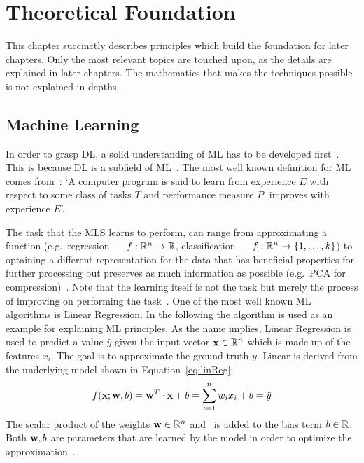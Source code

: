 \chapter{Theoretical Foundation}\label{ch:theoretical}
This chapter succinctly describes principles which build the foundation for later chapters.
Only the most relevant topics are touched upon, as the details are explained in later chapters.
The mathematics that makes the techniques possible is not explained in depths.

\section{Machine Learning}
In order to grasp \ac{DL}, a solid understanding of \ac{ML} has to be developed
first~\citep{goodfellow_deep_2016}.
This is because \ac{DL} is a subfield of \ac{ML}~\citep{chauhan_review_2018}.
The most well known definition for \ac{ML} comes from~\cite{mitchell_machine_1997}:
`A computer program is said to learn from experience $E$ with respect to some class of tasks $T$
and performance measure $P$, improves with experience $E$'.


The task that the \ac{MLS} learns to perform, can range from approximating a function
(e.g.\ regression --- $f:\mathbb{R}^n \rightarrow \mathbb{R}$, classification ---
$f:\mathbb{R}^n \rightarrow \{1,\ldots,k\}$) to optaining a different representation for the data that
has beneficial properties for further processing but preserves as much information as possible
(e.g.\ PCA for compression)~\citep{goodfellow_deep_2016}.
Note that the learning itself is not the task but merely the process of improving on performing the
task~\citep{goodfellow_deep_2016}.
One of the most well known \ac{ML} algorithms is Linear Regression.
In the following the algorithm is used as an example for explaining \ac{ML} principles.
As the name implies, Linear Regression is used to predict a value $\hat{y}$ given the input vector
$\textbf{x}\in\mathbb{R}^n$ which is made up of the features $x_i$.
The goal is to approximate the ground truth $y$.
Linear is derived from the underlying model shown in Equation~\ref{eq:linReg}:
\begin{equation}\label{eq:linReg}
    f(\textbf{x};\textbf{w},b) = \textbf{w}^{T} \cdot \textbf{x} + b = \sum_{i=1}^{n} w_i x_i + b = \hat{y}
\end{equation}
The scalar product of the weights $\textbf{w}\in\mathbb{R}^n$ and \x\ is added to the bias term $b\in\mathbb{R}$.
Both $\textbf{w},b$ are parameters that are learned by the model in order to optimize the
approximation~\citep{goodfellow_deep_2016}.

